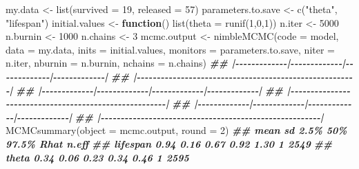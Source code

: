 \documentclass[
  12pt,
]{krantz}
\newenvironment{Shaded}{\begin{snugshade}}{\end{snugshade}}
\newcommand{\AttributeTok}[1]{\textcolor[rgb]{0.77,0.63,0.00}{#1}}
\newcommand{\ControlFlowTok}[1]{\textcolor[rgb]{0.13,0.29,0.53}{\textbf{#1}}}
\newcommand{\DecValTok}[1]{\textcolor[rgb]{0.00,0.00,0.81}{#1}}
\newcommand{\DocumentationTok}[1]{\textcolor[rgb]{0.56,0.35,0.01}{\textbf{\textit{#1}}}}
\newcommand{\FunctionTok}[1]{\textcolor[rgb]{0.00,0.00,0.00}{#1}}
\newcommand{\NormalTok}[1]{#1}
\newcommand{\OtherTok}[1]{\textcolor[rgb]{0.56,0.35,0.01}{#1}}
\newcommand{\StringTok}[1]{\textcolor[rgb]{0.31,0.60,0.02}{#1}}
\begin{document}
\begin{Shaded}
\begin{Highlighting}[]
\NormalTok{my.data }\OtherTok{\textless{}{-}} \FunctionTok{list}\NormalTok{(}\AttributeTok{survived =} \DecValTok{19}\NormalTok{, }\AttributeTok{released =} \DecValTok{57}\NormalTok{)}
\NormalTok{parameters.to.save }\OtherTok{\textless{}{-}} \FunctionTok{c}\NormalTok{(}\StringTok{"theta"}\NormalTok{, }\StringTok{"lifespan"}\NormalTok{)}
\NormalTok{initial.values }\OtherTok{\textless{}{-}} \ControlFlowTok{function}\NormalTok{() }\FunctionTok{list}\NormalTok{(}\AttributeTok{theta =} \FunctionTok{runif}\NormalTok{(}\DecValTok{1}\NormalTok{,}\DecValTok{0}\NormalTok{,}\DecValTok{1}\NormalTok{))}
\NormalTok{n.iter }\OtherTok{\textless{}{-}} \DecValTok{5000}
\NormalTok{n.burnin }\OtherTok{\textless{}{-}} \DecValTok{1000}
\NormalTok{n.chains }\OtherTok{\textless{}{-}} \DecValTok{3}
\NormalTok{mcmc.output }\OtherTok{\textless{}{-}} \FunctionTok{nimbleMCMC}\NormalTok{(}\AttributeTok{code =}\NormalTok{ model,}
                          \AttributeTok{data =}\NormalTok{ my.data,}
                          \AttributeTok{inits =}\NormalTok{ initial.values,}
                          \AttributeTok{monitors =}\NormalTok{ parameters.to.save,}
                          \AttributeTok{niter =}\NormalTok{ n.iter,}
                          \AttributeTok{nburnin =}\NormalTok{ n.burnin,}
                          \AttributeTok{nchains =}\NormalTok{ n.chains)}
\DocumentationTok{\#\# |{-}{-}{-}{-}{-}{-}{-}{-}{-}{-}{-}{-}{-}|{-}{-}{-}{-}{-}{-}{-}{-}{-}{-}{-}{-}{-}|{-}{-}{-}{-}{-}{-}{-}{-}{-}{-}{-}{-}{-}|{-}{-}{-}{-}{-}{-}{-}{-}{-}{-}{-}{-}{-}|}
\DocumentationTok{\#\# |{-}{-}{-}{-}{-}{-}{-}{-}{-}{-}{-}{-}{-}{-}{-}{-}{-}{-}{-}{-}{-}{-}{-}{-}{-}{-}{-}{-}{-}{-}{-}{-}{-}{-}{-}{-}{-}{-}{-}{-}{-}{-}{-}{-}{-}{-}{-}{-}{-}{-}{-}{-}{-}{-}{-}|}
\DocumentationTok{\#\# |{-}{-}{-}{-}{-}{-}{-}{-}{-}{-}{-}{-}{-}|{-}{-}{-}{-}{-}{-}{-}{-}{-}{-}{-}{-}{-}|{-}{-}{-}{-}{-}{-}{-}{-}{-}{-}{-}{-}{-}|{-}{-}{-}{-}{-}{-}{-}{-}{-}{-}{-}{-}{-}|}
\DocumentationTok{\#\# |{-}{-}{-}{-}{-}{-}{-}{-}{-}{-}{-}{-}{-}{-}{-}{-}{-}{-}{-}{-}{-}{-}{-}{-}{-}{-}{-}{-}{-}{-}{-}{-}{-}{-}{-}{-}{-}{-}{-}{-}{-}{-}{-}{-}{-}{-}{-}{-}{-}{-}{-}{-}{-}{-}{-}|}
\DocumentationTok{\#\# |{-}{-}{-}{-}{-}{-}{-}{-}{-}{-}{-}{-}{-}|{-}{-}{-}{-}{-}{-}{-}{-}{-}{-}{-}{-}{-}|{-}{-}{-}{-}{-}{-}{-}{-}{-}{-}{-}{-}{-}|{-}{-}{-}{-}{-}{-}{-}{-}{-}{-}{-}{-}{-}|}
\DocumentationTok{\#\# |{-}{-}{-}{-}{-}{-}{-}{-}{-}{-}{-}{-}{-}{-}{-}{-}{-}{-}{-}{-}{-}{-}{-}{-}{-}{-}{-}{-}{-}{-}{-}{-}{-}{-}{-}{-}{-}{-}{-}{-}{-}{-}{-}{-}{-}{-}{-}{-}{-}{-}{-}{-}{-}{-}{-}|}
\FunctionTok{MCMCsummary}\NormalTok{(}\AttributeTok{object =}\NormalTok{ mcmc.output, }\AttributeTok{round =} \DecValTok{2}\NormalTok{)}
\DocumentationTok{\#\#          mean   sd 2.5\%  50\% 97.5\% Rhat n.eff}
\DocumentationTok{\#\# lifespan 0.94 0.16 0.67 0.92  1.30    1  2549}
\DocumentationTok{\#\# theta    0.34 0.06 0.23 0.34  0.46    1  2595}
\end{Highlighting}
\end{Shaded}
\end{document}
